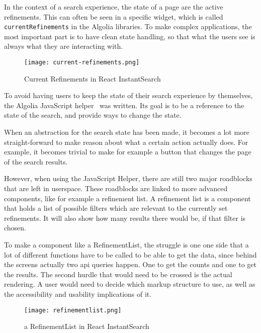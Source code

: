 In the context of a search experience, the state of a page are the active refinements. This can often be seen in a specific widget, which is called {\tt currentRefinements} in the Algolia libraries. To make complex applications, the most important part is to have clean state handling, so that what the users see is always what they are interacting with.

\begin{figure}[H]
  \centering
  \texttt{[image: current-refinements.png]}
  \caption{Current Refinements in React InstantSearch\cite{ris-storybooks}}
  \label{figure:current-refinements}
\end{figure}

To avoid having users to keep the state of their search experience by themselves, the Algolia JavaScript helper~\cite{algolia-js-helper} was written. Its goal is to be a reference to the state of the search, and provide ways to change the state.

When an abstraction for the search state has been made, it becomes a lot more straight-forward to make reason about what a certain action actually does. For example, it becomes trivial to make for example a button that changes the page of the search results.

However, when using the JavaScript Helper, there are still two major roadblocks that are left in \gls{userspace}. These roadblocks are linked to more advanced components, like for example a refinement list. A refinement list is a component that holds a list of possible filters which are relevant to the currently set refinements. It will also show how many results there would be, if that filter is chosen.

To make a component like a RefinementList, the struggle is one one side that a lot of different functions have to be called to be able to get the data, since behind the screens actually two \acrshort{api} queries happen. One to get the counts and one to get the results. The second hurdle that would need to be crossed is the actual rendering. A user would need to decide which markup structure to use, as well as the accessibility and usability implications of it.

\begin{figure}[H]
  \centering
  \texttt{[image: refinementlist.png]}
  \caption{a RefinementList in React InstantSearch\cite{ris-storybooks}}
  \label{figure:refinementlist-ris}
\end{figure}

